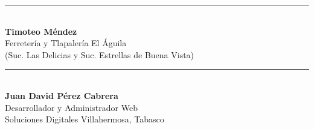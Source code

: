 \documentclass[10pt,letterpaper]{article}
\begin{document}
\noindent\begin{minipage}[t]{0.45\textwidth}
    \centering
    \vspace{0.7cm}
    \rule{0.85\textwidth}{0.6pt}\\
    \footnotesize\textbf{Timoteo Méndez}\\
    Ferretería y Tlapalería El Águila\\
    {\scriptsize (Suc. Las Delicias y Suc. Estrellas de Buena Vista)}
\end{minipage}
\hfill
\begin{minipage}[t]{0.45\textwidth}
    \centering
    \vspace{0.7cm}
    \rule{0.85\textwidth}{0.6pt}\\
    \footnotesize\textbf{Juan David Pérez Cabrera}\\
    Desarrollador y Administrador Web\\
    {\scriptsize Soluciones Digitales Villahermosa, Tabasco}
\end{minipage}
\end{document}
